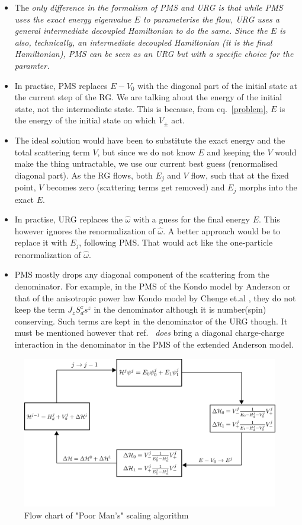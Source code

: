 \documentclass[14pt]{extarticle}
\numberwithin{equation}{section}
\begin{document}
\begin{itemize}
	\item The \it{only} difference in the formalism of PMS and URG is that while PMS uses the exact energy eigenvalue \(E\) to parameterise the flow, URG uses a general intermediate decoupled Hamiltonian to do the same. Since the \(E\) is also, technically, an intermediate decoupled Hamiltonian (it is the final Hamiltonian), PMS can be seen as an URG but with a specific choice for the paramter.
	\item In practise, PMS replaces \(E-V_0\) with the diagonal part of the initial state at the current step of the RG. We are talking about the energy of the initial state, not the intermediate state. This is because, from eq.~\ref{problem}, \(E\) is the energy of the initial state on which \(V_\pm\) act. 
	\item The ideal solution would have been to substitute the exact energy and the total scattering term \(V\), but since we do not know \(E\) and keeping the \(V\) would make the thing untractable, we use our current best guess (renormalised diagonal part). As the RG flows, both \(E_j\) and \(V\) flow, such that at the fixed point, \(V\) becomes zero (scattering terms get removed) and \(E_j\) morphs into the exact \(E\). 
	\item In practise, URG replaces the \(\hat \omega\) with a guess for the final energy \(E\). This however ignores the renormalization of \(\hat \omega\). A better approach would be to replace it with \(E_j\), following PMS. That would act like the one-particle renormalization of \(\hat \omega\).
	\item PMS mostly drops any diagonal component of the scattering from the denominator. For example, in the PMS of the Kondo model by Anderson \cite{Anderson} or that of the anisotropic power law Kondo model by Chenge et.al \cite{tatha}, they do not keep the term \(J_z S_d^z s^z\) in the denominator although it is number(spin) conserving. Such terms are kept in the denominator of the URG though. It must be mentioned however that ref.~\cite{raja} \textit{does} bring a diagonal charge-charge interaction in the denominator in the PMS of the extended Anderson model.
\end{itemize}
\begin{figure}
	\centering
	\includegraphics[scale=0.35]{pms-flowchart.png}
	\caption{Flow chart of "Poor Man's" scaling algorithm}
	\label{pmsflow}
\end{figure}
\end{document}
